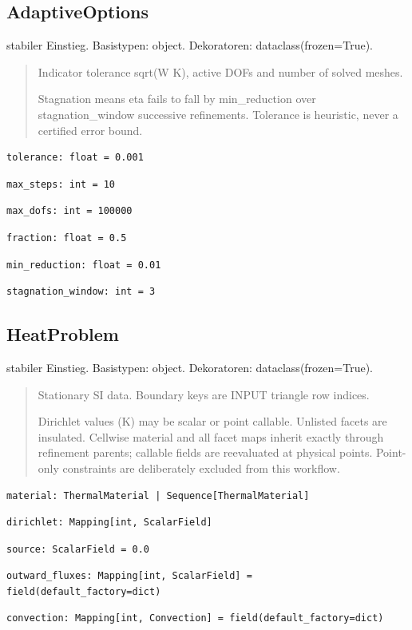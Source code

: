 \subsection{AdaptiveOptions}
stabiler Einstieg.
Basistypen: object. Dekoratoren: dataclass(frozen=True).
\begin{quote}
Indicator tolerance sqrt(W K), active DOFs and number of solved meshes.\par Stagnation means eta fails to fall by min\_reduction over stagnation\_window successive refinements. Tolerance is heuristic, never a certified error bound.
\end{quote}
\begin{lstlisting}
tolerance: float = 0.001
\end{lstlisting}
\begin{lstlisting}
max_steps: int = 10
\end{lstlisting}
\begin{lstlisting}
max_dofs: int = 100000
\end{lstlisting}
\begin{lstlisting}
fraction: float = 0.5
\end{lstlisting}
\begin{lstlisting}
min_reduction: float = 0.01
\end{lstlisting}
\begin{lstlisting}
stagnation_window: int = 3
\end{lstlisting}
\subsection{HeatProblem}
stabiler Einstieg.
Basistypen: object. Dekoratoren: dataclass(frozen=True).
\begin{quote}
Stationary SI data. Boundary keys are INPUT triangle row indices.\par Dirichlet values (K) may be scalar or point callable. Unlisted facets are insulated. Cellwise material and all facet maps inherit exactly through refinement parents; callable fields are reevaluated at physical points. Point-only constraints are deliberately excluded from this workflow.
\end{quote}
\begin{lstlisting}
material: ThermalMaterial | Sequence[ThermalMaterial]
\end{lstlisting}
\begin{lstlisting}
dirichlet: Mapping[int, ScalarField]
\end{lstlisting}
\begin{lstlisting}
source: ScalarField = 0.0
\end{lstlisting}
\begin{lstlisting}
outward_fluxes: Mapping[int, ScalarField] = field(default_factory=dict)
\end{lstlisting}
\begin{lstlisting}
convection: Mapping[int, Convection] = field(default_factory=dict)
\end{lstlisting}
